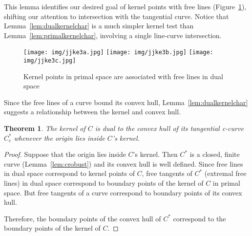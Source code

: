 \documentclass{sig-alternate}
\newif\ifJournal
\newcommand{\Comment}[1]{\relax}  %
\newcommand{\prf}{\noindent{{\bf Proof}:\ \ \ }}
\newtheorem{theorem}{Theorem}
\begin{document}
This lemma identifies our desired goal of kernel points with free lines (Figure~\ref{fig:freeline}),
shifting our attention to intersection with the tangential curve.
Notice that Lemma~\ref{lem:dualkernelchar} is a much simpler kernel test than 
Lemma~\ref{lem:primalkernelchar},
involving a single line-curve intersection.

\begin{figure}[h]
\begin{center}
\texttt{[image: img/jjke3a.jpg]}
\texttt{[image: img/jjke3b.jpg]}
\texttt{[image: img/jjke3c.jpg]}
\end{center}
\caption{Kernel points in primal space are associated with free lines in dual space}
\label{fig:freeline}
\end{figure}

Since the free lines of a curve bound its convex hull,
Lemma~\ref{lem:dualkernelchar} suggests a relationship between the kernel 
and convex hull.

\begin{theorem}
\label{thm:kerneldual}
The kernel of $C$ is dual to the convex hull of its tangential c-curve $C^*_c$
whenever the origin lies inside $C$'s kernel.
\end{theorem}
\ifACM
\begin{proof}
\else
\prf
\fi
Suppose that the origin lies inside $C$'s kernel.
Then $C^*$ is a closed, finite curve (Lemma~\ref{lem:crobust}) 
and its convex hull is well defined.
Since free lines in dual space correspond to kernel points of $C$,
free tangents of $C^*$ (extremal free lines) %
in dual space correspond to boundary points of the kernel of $C$ in primal space.
But free tangents of a curve correspond to boundary points of its convex hull.
\ifJournal
	In particular, the envelope of a curve's free tangents define its convex hull.
\fi
Therefore, the boundary points of the convex hull of $C^*$ correspond to the 
boundary points of the kernel of $C$.
%
\Comment{
Typically, points in primal space would be associated with lines in dual space,
but we can use the parameterization to associate points with points,
as outlined below.
}
\ifACM
\end{proof}
\else
\prf
\fi
\end{document}
